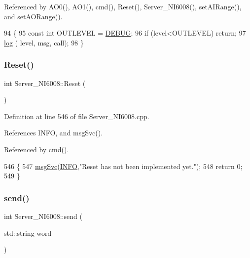 Referenced by A\+O0(), A\+O1(), cmd(), Reset(), Server\+\_\+\+N\+I6008(), set\+A\+I\+Range(), and set\+A\+O\+Range().


\begin{DoxyCode}
94                                      \{
95   \textcolor{keyword}{const} \textcolor{keywordtype}{int} OUTLEVEL = \hyperlink{classServer__NI6008_af1e3e3bac26355a746b5d2e548fe25bead3eef0ad5b826981e274ce214fd3a6d3}{DEBUG};
96   \textcolor{keywordflow}{if} (level<OUTLEVEL) \textcolor{keywordflow}{return};
97   \hyperlink{classServer__NI6008_ab83d0f144d5bb34f3a22aabef37de440}{log} ( level, msg, call);  
98 \} 
\end{DoxyCode}
\mbox{\label{classServer__NI6008_a0495ec12779e4b9bfdda3d60c0ef20aa}} 
\subsubsection{\texorpdfstring{Reset()}{Reset()}}
{\footnotesize\ttfamily int Server\+\_\+\+N\+I6008\+::\+Reset (\begin{DoxyParamCaption}{ }\end{DoxyParamCaption})}



Definition at line 546 of file Server\+\_\+\+N\+I6008.\+cpp.



References I\+N\+FO, and msg\+Svc().



Referenced by cmd().


\begin{DoxyCode}
546                         \{
547   \hyperlink{classServer__NI6008_a140d5f91d6c0f4fb963ecf747e44df78}{msgSvc}(\hyperlink{classServer__NI6008_af1e3e3bac26355a746b5d2e548fe25bea218489470a9743b7d475e86e13ea219d}{INFO},\textcolor{stringliteral}{"Reset has not been implemented yet."});
548   \textcolor{keywordflow}{return} 0;
549 \}
\end{DoxyCode}
\mbox{\label{classServer__NI6008_af47694911afff2feb37a091d9fcab4fa}} 
\subsubsection{\texorpdfstring{send()}{send()}}
{\footnotesize\ttfamily int Server\+\_\+\+N\+I6008\+::send (\begin{DoxyParamCaption}\item[{std\+::string}]{word }\end{DoxyParamCaption})\hspace{0.3cm}{\ttfamily [inline]}}



